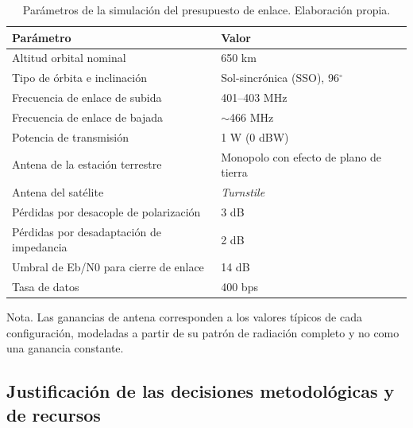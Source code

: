 \begin{table}[H]
\centering
\begin{threeparttable}
\caption{Parámetros de la simulación del presupuesto de enlace. Elaboración propia.\vspace{1ex}}
\label{tab:linkbudget}
\small
\begin{tabularx}{\textwidth}{|@{\hspace{4pt}}X l@{\hspace{4pt}}|}
\toprule
\textbf{Parámetro} & \textbf{Valor} \\
\midrule
Altitud orbital nominal                       & 650 km \\
Tipo de órbita e inclinación                  & Sol-sincrónica (SSO), 96$^{\circ}$ \\
Frecuencia de enlace de subida                & 401--403 MHz \\
Frecuencia de enlace de bajada                & $\sim$466 MHz \\
Potencia de transmisión                       & 1 W (0 dBW) \\
Antena de la estación terrestre               & Monopolo con efecto de plano de tierra \\
Antena del satélite                           & \textit{Turnstile} \\
Pérdidas por desacople de polarización        & 3 dB \\
Pérdidas por desadaptación de impedancia      & 2 dB \\
Umbral de Eb/N0 para cierre de enlace         & 14 dB \\
Tasa de datos                                 & 400 bps \\
\bottomrule
\end{tabularx}
\begin{tablenotes}[flushleft]\footnotesize
\item Nota. Las ganancias de antena corresponden a los valores típicos de cada configuración, modeladas a partir de su patrón de radiación completo y no como una ganancia constante.
\end{tablenotes}
\end{threeparttable}
\end{table}



\subsection{Justificación de las decisiones metodológicas y de recursos}

